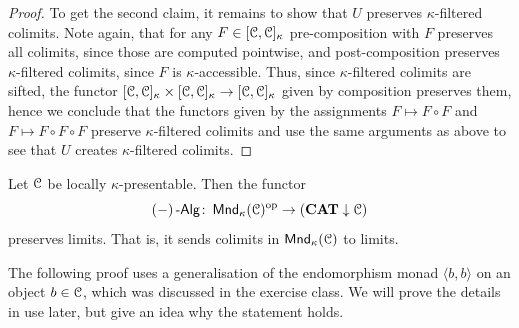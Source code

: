 \documentclass[a4paper,11pt,oneside,openany]{scrbook}
\begin{document}
\begin{proof}
	To get the second claim, it remains to show that $U$ preserves
    $\kappa$-filtered colimits. Note again, that for any $F \in
    [\operatorname{\mathcal{C}},\operatorname{\mathcal{C}}]_{\kappa}$ pre-composition with $F$ preserves all colimits, since
    those are computed pointwise, and post-composition preserves
    $\kappa$-filtered colimits, since $F$ is $\kappa$-accessible.  Thus, since
    $\kappa$-filtered colimits are sifted, the functor $[\operatorname{\mathcal{C}},\operatorname{\mathcal{C}}]_{\kappa} \times
    [\operatorname{\mathcal{C}},\operatorname{\mathcal{C}}]_{\kappa} \to [\operatorname{\mathcal{C}},\operatorname{\mathcal{C}}]_{\kappa}$ given by composition preserves them,
    hence we conclude that the functors given by the assignments $F \mapsto F
    \circ F$ and $F \mapsto F \circ F \circ F$ preserve $\kappa$-filtered
    colimits and use the same arguments as above to see that $U$ creates
    $\kappa$-filtered colimits.
\end{proof}

\begin{prop}
	Let $\operatorname{\mathcal{C}}$ be locally $\kappa$-presentable. Then the functor
	\begin{equation*}
		\left(-\right)\operatorname{-\mathsf{Alg}} \colon \operatorname{\mathsf{Mnd}}_{\kappa}(\operatorname{\mathcal{C}})^{\operatorname{\text{op}}} \to ({\normalfont\textbf{CAT}} \downarrow \operatorname{\mathcal{C}})
	\end{equation*}
	preserves limits. That is, it sends colimits in $\operatorname{\mathsf{Mnd}}_{\kappa}(\operatorname{\mathcal{C}})$ to limits.
\end{prop}

The following proof uses a generalisation of the endomorphism monad $\langle
b,b\rangle$ on an object $b \in \operatorname{\mathcal{C}}$, which was discussed in the exercise class.
We will prove the details in use later, but give an idea why the statement
holds.
\end{document}
